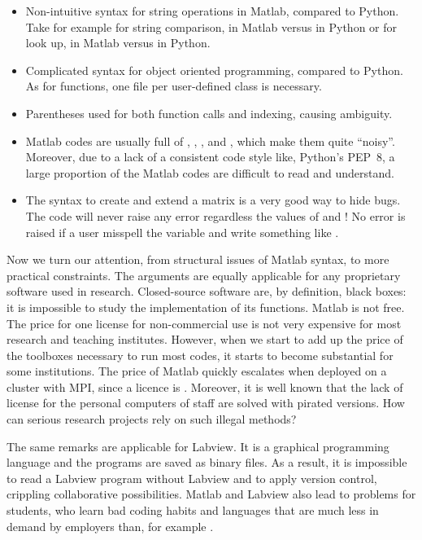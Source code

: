 \begin{itemize}
\item Non-intuitive syntax for string operations in Matlab, compared to
Python. Take for example for string comparison,  in
Matlab versus  in Python or for look up,
 in Matlab versus 
in Python.
\item Complicated syntax for object oriented programming, compared to Python.
As for functions, one file per user-defined class is necessary.
\item Parentheses used for both function calls and indexing, causing ambiguity.
\item Matlab codes are usually full of \codeinline{;}, ,
, \codeinline{\&\&} and \codeinline{||}, which make them quite
``noisy''.  Moreover, due to a lack of a consistent code style like, Python's
PEP~8, a
large proportion of the Matlab codes are difficult to read and understand.
\item The syntax  to create and extend a matrix is a
very good way to hide bugs. The code 
will never raise any error regardless the values of  and
! No error is raised if a user misspell the variable
 and write something like .
\end{itemize}
%
Now we turn our attention, from structural issues of Matlab syntax, to more
practical constraints. The arguments are equally applicable for
any proprietary software used in research. Closed-source
software are, by definition, black boxes: it is impossible to study the
implementation of its functions.
%
Matlab is not free. The price for one license for non-commercial use is not
very expensive for most research and teaching institutes. However, when we
start to add up the price of the toolboxes necessary to run most codes, it
starts to become substantial for some institutions.  The price of
Matlab quickly escalates when deployed on a cluster with MPI, since a licence
is .
%
Moreover, it is well known that the lack of license for the personal computers
of staff are solved with pirated versions. How can serious
research projects rely on such illegal methods?

The same remarks are applicable for Labview. It is a graphical programming
language and the programs are saved as binary files. As a result, it is
impossible to read a Labview program without Labview and to apply version
control, crippling collaborative possibilities.
%
Matlab and Labview also lead to problems for students, who learn bad coding
habits and languages that are much less in demand by employers than, for example
.


